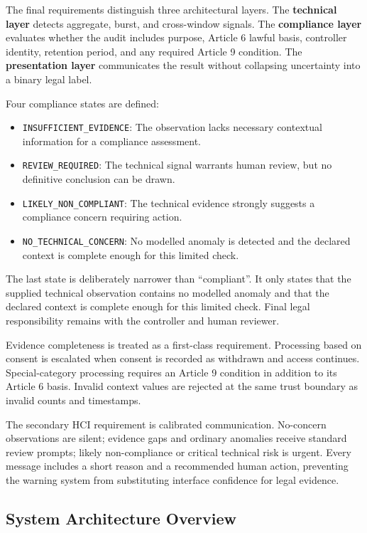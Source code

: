 The final requirements distinguish three architectural layers. The \textbf{technical layer} detects aggregate, burst, and cross-window signals. The \textbf{compliance layer} evaluates whether the audit includes purpose, Article 6 lawful basis, controller identity, retention period, and any required Article 9 condition. The \textbf{presentation layer} communicates the result without collapsing uncertainty into a binary legal label.

Four compliance states are defined:
\begin{itemize}
\item \texttt{INSUFFICIENT\_EVIDENCE}: The observation lacks necessary contextual information for a compliance assessment.
\item \texttt{REVIEW\_REQUIRED}: The technical signal warrants human review, but no definitive conclusion can be drawn.
\item \texttt{LIKELY\_NON\_COMPLIANT}: The technical evidence strongly suggests a compliance concern requiring action.
\item \texttt{NO\_TECHNICAL\_CONCERN}: No modelled anomaly is detected and the declared context is complete enough for this limited check.
\end{itemize}

The last state is deliberately narrower than ``compliant''. It only states that the supplied technical observation contains no modelled anomaly and that the declared context is complete enough for this limited check. Final legal responsibility remains with the controller and human reviewer.

Evidence completeness is treated as a first-class requirement. Processing based on consent is escalated when consent is recorded as withdrawn and access continues. Special-category processing requires an Article 9 condition in addition to its Article 6 basis. Invalid context values are rejected at the same trust boundary as invalid counts and timestamps.

The secondary HCI requirement is calibrated communication. No-concern observations are silent; evidence gaps and ordinary anomalies receive standard review prompts; likely non-compliance or critical technical risk is urgent. Every message includes a short reason and a recommended human action, preventing the warning system from substituting interface confidence for legal evidence.

\subsection{System Architecture Overview}

